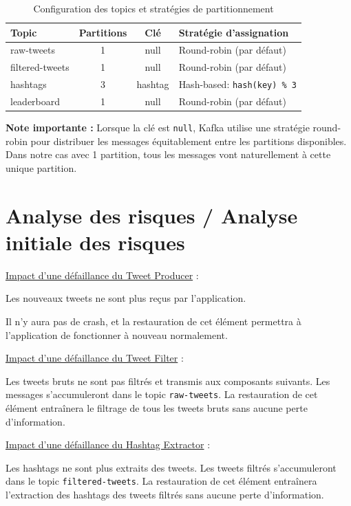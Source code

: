 \documentclass[10pt,a4paper]{article}
\begin{document}
\begin{table}[h]
\centering
\caption{Configuration des topics et stratégies de partitionnement}
\begin{tabular}{|l|c|c|l|}
\hline
\textbf{Topic} & \textbf{Partitions} & \textbf{Clé} & \textbf{Stratégie d'assignation} \\
\hline
raw-tweets & 1 & null & Round-robin (par défaut) \\
\hline
filtered-tweets & 1 & null & Round-robin (par défaut) \\
\hline
hashtags & 3 & hashtag & Hash-based: \texttt{hash(key) \% 3} \\
\hline
leaderboard & 1 & null & Round-robin (par défaut) \\
\hline
\end{tabular}
\label{tab:partitioning-strategy}
\end{table}

\textbf{Note importante :} Lorsque la clé est \texttt{null}, Kafka utilise une stratégie round-robin pour distribuer les messages équitablement entre les partitions disponibles. Dans notre cas avec 1 partition, tous les messages vont naturellement à cette unique partition.


\section{Analyse des risques / Analyse initiale des risques}

\underline{Impact d'une défaillance du Tweet Producer} :

Les nouveaux tweets ne sont plus reçus par l'application.

Il n'y aura pas de crash, et la restauration de cet élément permettra à l'application de fonctionner à nouveau normalement.

\underline{Impact d'une défaillance du Tweet Filter} :

Les tweets bruts ne sont pas filtrés et transmis aux composants suivants. Les messages s'accumuleront dans le topic \texttt{raw-tweets}. La restauration de cet élément entraînera le filtrage de tous les tweets bruts sans aucune perte d'information.

\underline{Impact d'une défaillance du Hashtag Extractor} :

Les hashtags ne sont plus extraits des tweets. Les tweets filtrés s'accumuleront dans le topic \texttt{filtered-tweets}. La restauration de cet élément entraînera l'extraction des hashtags des tweets filtrés sans aucune perte d'information.
\end{document}
